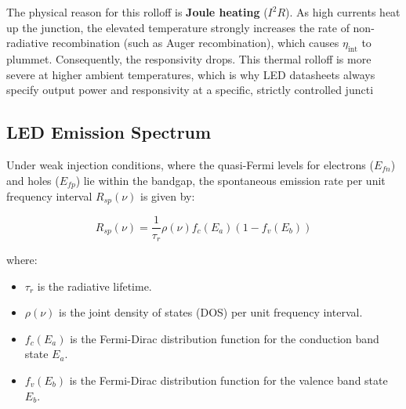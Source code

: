 The physical reason for this rolloff is \textbf{Joule heating} ($I^2R$). As high currents heat up the junction, the elevated temperature strongly increases the rate of non-radiative recombination (such as Auger recombination), which causes $\eta_\text{int}$ to plummet. Consequently, the responsivity drops. This thermal rolloff is more severe at higher ambient temperatures, which is why LED datasheets always specify output power and responsivity at a specific, strictly controlled juncti\subsection{LED Emission Spectrum}

Under weak injection conditions, where the quasi-Fermi levels for electrons ($E_{fn}$) and holes ($E_{fp}$) lie within the bandgap, the spontaneous emission rate per unit frequency interval $R_{sp}(\nu)$ is given by:
\begin{keyresult}
    \begin{equation}
        R_{sp}(\nu) = \frac{1}{\tau_r}\rho(\nu)f_c(E_a)(1-f_v(E_b))
    \end{equation}
\end{keyresult}
where:
\begin{itemize}
    \item $\tau_r$ is the radiative lifetime.
    \item $\rho(\nu)$ is the joint density of states (DOS) per unit frequency interval.
    \item $f_c(E_a)$ is the Fermi-Dirac distribution function for the conduction band state $E_a$.
    \item $f_v(E_b)$ is the Fermi-Dirac distribution function for the valence band state $E_b$.
\end{itemize}

